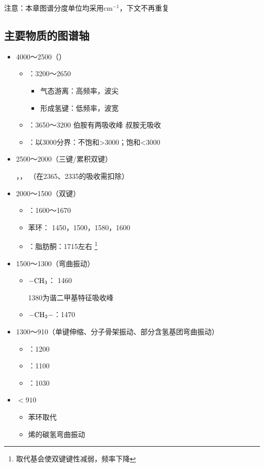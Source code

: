 注意：本章图谱分度单位均采用$\mathrm{cm^{-1}}$，下文不再重复

\subsection{主要物质的图谱轴}
\begin{itemize}
	\item 4000～2500（）
	\begin{itemize}         
		\item {}：3200～2650
		\begin{itemize}
			\item 气态游离：高频率，波尖
			\item 形成氢键：低频率，波宽
		\end{itemize}       
		\item {}：3650～3200	伯胺有两吸收峰 叔胺无吸收
		\item {}：以3000分界：不饱和>3000；饱和<3000
	\end{itemize}
	\item 2500～2000（三键/累积双键）
	\begin{example}                             
		，， （在2365、2335的吸收需扣除）
	\end{example}
	\item 2000～1500（双键）
	\begin{itemize}         
		\item {}：1600～1670
		\item 苯环：   1450，1500，1580，1600
		\item {}：脂肪酮：1715左右
		\footnote{取代基会使双键键性减弱，频率下降}
	\end{itemize}
	\item 1500～1300（弯曲振动）
	\begin{itemize}        
		\item $\ce{-CH3}$： 1460
		\begin{note}
			1380为谐二甲基特征吸收峰
		\end{note}            
		\item $\ce{-CH_{2}-}$：1470
	\end{itemize}
	\item 1300～910（单键伸缩、分子骨架振动、部分含氢基团弯曲振动）
	\begin{itemize}    
		\item {}：1200
		\item {}：1100
		\item {}：1030
	\end{itemize}
	\item $<910$
	\begin{itemize}
		\item 苯环取代
		\item 烯的碳氢弯曲振动
	\end{itemize}
\end{itemize}

